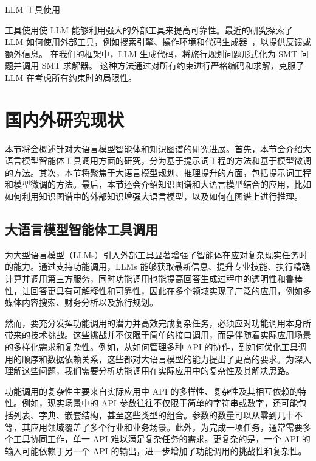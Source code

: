 LLM 工具使用

工具使用使 LLM 能够利用强大的外部工具来提高可靠性。最近的研究探索了 LLM 如何使用外部工具，例如搜索引擎、操作环境和代码生成器~\cite{press2022measuring, yao2022react, schick2024toolformer, liang2023code, singh2023progprompt, peng2023check, song2023llm, huang2022inner}，以提供反馈或额外信息。
在我们的框架中，LLM 生成代码，将旅行规划问题形式化为 SMT 问题并调用 SMT 求解器。
这种方法通过对所有约束进行严格编码和求解，克服了 LLM 在考虑所有约束时的局限性。


\section{国内外研究现状}

本节将会概述针对大语言模型智能体和知识图谱的研究进展。首先，本节会介绍大语言模型智能体工具调用方面的研究，分为基于提示词工程的方法和基于模型微调的方法。其次，本节将聚焦于大语言模型规划、推理提升的方面，包括提示词工程和模型微调的方法。最后，本节还会介绍知识图谱和大语言模型结合的应用，比如如何利用知识图谱中的外部知识增强大语言模型，以及如何在图谱上进行推理。

\subsection{大语言模型智能体工具调用}

为大型语言模型（LLMs）引入外部工具显著增强了智能体在应对复杂现实任务时的能力\cite{huang2024planning, Qin2023, qu2024tool}。通过支持功能调用，LLMs 能够获取最新信息、提升专业技能、执行精确计算并调用第三方服务，同时功能调用也能提高回答生成过程中的透明性和鲁棒性，让回答更具有可解释性和可靠性，因此在多个领域实现了广泛的应用，例如多媒体内容搜索\cite{Song2023}、财务分析\cite{theuma2024equipping}以及旅行规划\cite{hao2024large}。

然而，要充分发挥功能调用的潜力并高效完成复杂任务，必须应对功能调用本身所带来的技术挑战。这些挑战并不仅限于简单的接口调用，而是伴随着实际应用场景的多样化需求和复杂性。例如，从如何管理多种 API 的协作，到如何优化工具调用的顺序和数据依赖关系，这些都对大语言模型的能力提出了更高的要求\cite{huang2024planning, Qin2023}。为深入理解这些问题，我们需要分析功能调用在实际应用中的复杂性及其解决思路。

功能调用的复杂性主要来自实际应用中 API 的多样性、复杂性及其相互依赖的特性\cite{Qin2023}。例如，现实场景中的 API 参数往往不仅限于简单的字符串或数字，还可能包括列表、字典、嵌套结构，甚至这些类型的组合。参数的数量可以从零到几十不等，其应用领域覆盖了多个行业和业务场景\cite{ye2024tooleyes}。此外，为完成一项任务，通常需要多个工具协同工作，单一 API 难以满足复杂任务的需求\cite{huang2024planning}。更复杂的是，一个 API 的输入可能依赖于另一个 API 的输出\cite{Qin2023}，进一步增加了功能调用的挑战性和复杂性。

